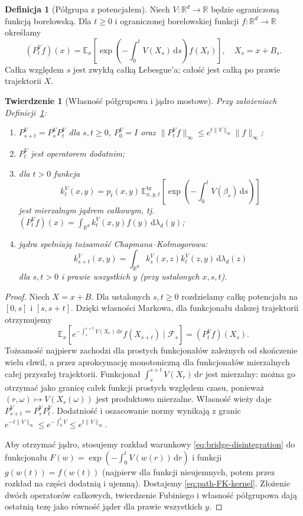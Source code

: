\documentclass[11pt,a4paper,oneside]{report}
\numberwithin{equation}{chapter}
\theoremstyle{plain}
\newtheorem{twierdzenie}{Twierdzenie}[chapter]
\theoremstyle{definition}
\newtheorem{definicja}{Definicja}[chapter]
\theoremstyle{remark}
\newcommand{\R}{\mathbb{R}}
\newcommand{\E}{\mathbb{E}}
\newcommand{\calF}{\mathcal{F}}
\newcommand{\dd}{\mathrm{d}}
\begin{document}
\begin{definicja}[Półgrupa z potencjałem]
\label{def:path-weighted-semigroup}
Niech $V:\R^d\to\R$ będzie ograniczoną funkcją borelowską.
Dla $t\ge0$ i ograniczonej borelowskiej funkcji
$f:\R^d\to\R$ określamy
\[
 (P_t^Vf)(x)=\E_x\left[
 \exp\left(-\int_0^tV(X_s)\,\dd s\right)f(X_t)\right],
 \quad X_s=x+B_s.
\tag{15.8}\label{eq:path-FK-semigroup}
\]
Całka względem $s$ jest zwykłą całką Lebesgue'a;
całość jest całką po prawie trajektorii $X$.
\end{definicja}

\begin{twierdzenie}[Własność półgrupowa i jądro mostowe]
\label{th:path-FK-kernel}
Przy założeniach Definicji~\ref{def:path-weighted-semigroup}:
\begin{enumerate}
\item $P_{s+t}^V=P_s^VP_t^V$ dla $s,t\ge0$,
$P_0^V=I$ oraz
$\|P_t^V f\|_\infty\le e^{t\|V\|_\infty}\|f\|_\infty$;
\item $P_t^V$ jest operatorem dodatnim;
\item dla $t>0$ funkcja
\[
 k_t^V(x,y)=p_t(x,y)\,
 \E_{x,y,t}^{\mathrm{br}}\left[
   \exp\left(-\int_0^tV(\beta_s)\,\dd s\right)\right]
 \tag{15.9}\label{eq:path-FK-kernel}
\]
jest mierzalnym jądrem całkowym, tj.
$(P_t^Vf)(x)=\int_{\R^d}k_t^V(x,y)f(y)\,\dd\lambda_d(y)$;
\item jądra spełniają tożsamość Chapmana--Kołmogorowa:
\[
 k_{s+t}^V(x,y)=\int_{\R^d}k_s^V(x,z)k_t^V(z,y)
 \,\dd\lambda_d(z)
\]
dla $s,t>0$ i prawie wszystkich $y$
(przy ustalonych $x,s,t$).
\end{enumerate}
\end{twierdzenie}
\begin{proof}
Niech $X=x+B$. Dla ustalonych $s,t\ge0$ rozdzielamy
całkę potencjału na $[0,s]$ i $[s,s+t]$. Dzięki własności
Markowa, dla funkcjonału dalszej trajektorii otrzymujemy
\[
 \E_x\left[e^{-\int_s^{s+t}V(X_r)\,\dd r}
    f(X_{s+t})\mid\calF_s\right]=(P_t^V f)(X_s).
\]
Tożsamość najpierw zachodzi dla prostych funkcjonałów
zależnych od skończenie wielu chwil, a przez aproksymację
monotoniczną dla funkcjonałów mierzalnych całej przyszłej
trajektorii. Funkcjonał $\int_s^{s+t}V(X_r)\,\dd r$
jest mierzalny: można go otrzymać jako granicę całek
funkcji prostych względem czasu, ponieważ
$(r,\omega)\mapsto V(X_r(\omega))$ jest produktowo
mierzalne. Własność wieży daje $P_{s+t}^V=P_s^VP_t^V$.
Dodatniość i oszacowanie normy wynikają z granic
$e^{-t\|V\|_\infty}\le e^{-\int_0^tV}\le e^{t\|V\|_\infty}$.

Aby otrzymać jądro, stosujemy rozkład warunkowy
\eqref{eq:bridge-disintegration} do funkcjonału
$F(w)=\exp(-\int_0^tV(w(r))\,\dd r)$
i funkcji $g(w(t))=f(w(t))$ (najpierw dla funkcji
nieujemnych, potem przez rozkład na części dodatnią
i ujemną). Dostajemy \eqref{eq:path-FK-kernel}.
Złożenie dwóch operatorów całkowych, twierdzenie
Fubiniego i własność półgrupowa dają ostatnią tezę
jako równość jąder dla prawie wszystkich $y$.
\end{proof}
\end{document}
